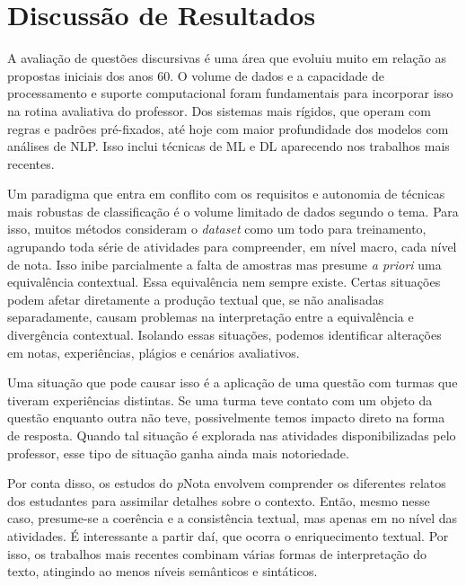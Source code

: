 \section{Discussão de Resultados}
\label{sec-discussao}

A avaliação de questões discursivas é uma área que evoluiu muito em relação as propostas iniciais dos anos 60. O volume de dados e a capacidade de processamento e suporte computacional foram fundamentais para incorporar isso na rotina avaliativa do professor. Dos sistemas mais rígidos, que operam com regras e padrões pré-fixados, até hoje com maior profundidade dos modelos com análises de NLP. Isso inclui técnicas de ML e DL aparecendo nos trabalhos mais recentes.

Um paradigma que entra em conflito com os requisitos e autonomia de técnicas mais robustas de classificação é o volume limitado de dados segundo o tema. Para isso, muitos métodos consideram o \textit{dataset} como um todo para treinamento, agrupando toda série de atividades para compreender, em nível macro, cada nível de nota. Isso inibe parcialmente a falta de amostras mas presume \textit{a priori} uma equivalência contextual. Essa equivalência nem sempre existe. Certas situações podem afetar diretamente a produção textual que, se não analisadas separadamente, causam problemas na interpretação entre a equivalência e divergência contextual. Isolando essas situações, podemos identificar alterações em notas, experiências, plágios e cenários avaliativos. 

Uma situação que pode causar isso é a aplicação de uma questão com turmas que tiveram experiências distintas. Se uma turma teve contato com um objeto da questão enquanto outra não teve, possivelmente temos impacto direto na forma de resposta. Quando tal situação é explorada nas atividades disponibilizadas pelo professor, esse tipo de situação ganha ainda mais notoriedade.

Por conta disso, os estudos do \textit{p}Nota envolvem comprender os diferentes relatos dos estudantes para assimilar detalhes sobre o contexto. Então, mesmo nesse caso, presume-se a coerência e a consistência textual, mas apenas em no nível das atividades. É interessante a partir daí, que ocorra o enriquecimento textual. Por isso, os trabalhos mais recentes combinam várias formas de interpretação do texto, atingindo ao menos níveis semânticos e sintáticos.


